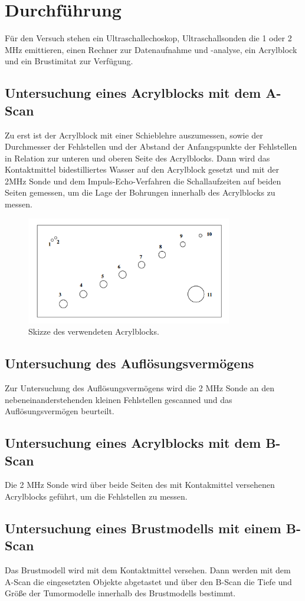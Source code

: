 \section{Durchführung}
\label{sec:Durchführung}
Für den Versuch stehen ein Ultraschallechoskop, Ultraschallsonden die 1 oder 2 MHz emittieren, einen Rechner zur Datenaufnahme und -analyse, ein Acrylblock und ein Brustimitat zur Verfügung.

\subsection{Untersuchung eines Acrylblocks mit dem A-Scan}
Zu erst ist der Acrylblock mit einer Schieblehre auszumessen, sowie der Durchmesser der Fehlstellen und der Abstand der Anfangspunkte der Fehlstellen in Relation zur unteren und oberen Seite des Acrylblocks.
Dann wird das Kontaktmittel bidestilliertes Wasser auf den Acrylblock gesetzt und mit der 2MHz Sonde und dem Impuls-Echo-Verfahren die Schallaufzeiten auf beiden Seiten gemessen, um die Lage der Bohrungen innerhalb des Acrylblocks zu messen.  
\begin{figure}[H]
  \centering
  \includegraphics[width=9cm]{content/block}
  \caption{Skizze des verwendeten Acrylblocks. \cite{1}}
\end{figure}

\subsection{Untersuchung des Auflösungsvermögens}
Zur Untersuchung des Auflösungsvermögens wird die 2 MHz Sonde an den nebeneinanderstehenden kleinen Fehlstellen gescanned und das Auflösungsvermögen beurteilt.

\subsection{Untersuchung eines Acrylblocks mit dem B-Scan}
Die 2 MHz Sonde wird über beide Seiten des mit Kontakmittel versehenen Acrylblocks geführt, um die Fehlstellen zu messen. 

\subsection{Untersuchung eines Brustmodells mit einem B-Scan}
Das Brustmodell wird mit dem Kontaktmittel versehen. Dann werden mit dem A-Scan die eingesetzten Objekte abgetastet und über den B-Scan die Tiefe und Größe der Tumormodelle innerhalb des Brustmodells bestimmt.
